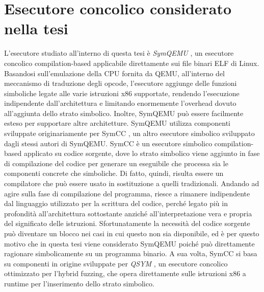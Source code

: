 \documentclass[Lau, oneside]{sapthesis}%
\begin{document}
\section{Esecutore concolico considerato nella tesi}
L'esecutore studiato all'interno di questa tesi è \textit{SymQEMU} \cite{ref:symqemu}, un esecutore concolico compilation-based applicabile direttamente sui file binari ELF di Linux.
\newline
Basandosi sull'emulazione della CPU fornita da QEMU, all'interno del meccanismo di traduzione degli opcode, l'esecutore aggiunge delle funzioni simboliche legate alle varie istruzioni x86 supportate, rendendo l'esecuzione indipendente dall'architettura e limitando enormemente l'overhead dovuto all'aggiunta dello strato simbolico.
\newline
Inoltre, SymQEMU può essere facilmente esteso per supportare altre architetture.
\newline \newline \newline
SymQEMU utilizza componenti sviluppate originariamente per SymCC \cite{ref:symcc}, un altro esecutore simbolico sviluppato dagli stessi autori di SymQEMU.
\newline
SymCC è un esecutore simbolico compilation-based applicato su codice sorgente, dove lo strato simbolico viene aggiunto in fase di compilazione del codice per generare un eseguibile che processa sia le componenti concrete che simboliche.
\newline
Di fatto, quindi, risulta essere un compilatore che può essere usato in sostituzione a quelli tradizionali.
\newline
Andando ad agire sulla fase di compilazione del programma, riesce a rimanere indipendente dal linguaggio utilizzato per la scrittura del codice, perché legato più in profondità all'architettura sottostante anziché all'interpretazione vera e propria del significato delle istruzioni.
\newline
Sfortunatamente la necessità del codice sorgente può diventare un blocco nei casi in cui questo non sia disponibile, ed è per questo motivo
che in questa tesi viene considerato SymQEMU poiché può direttamente ragionare simbolicamente su un programma binario.
\newline \newline \newline
A sua volta, SymCC si basa su componenti in origine sviluppate per \textit{QSYM} \cite{ref:qsym}, un esecutore concolico ottimizzato per l'hybrid fuzzing, che opera direttamente sulle istruzioni x86 a runtime per l'inserimento dello strato simbolico.
\end{document}
